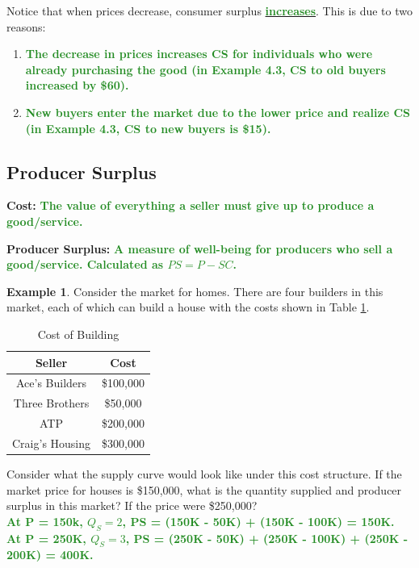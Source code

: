 \documentclass[11pt]{article}\usepackage[]{graphicx}\usepackage[]{color}
\theoremstyle{definition}
\newtheorem{exmp}{Example}[section]
\newcommand{\ddp}[1]{{\textbf{\textcolor{ForestGreen}{#1}}}}
\newcommand{\dd}[1]{{\underline{\textbf{\textcolor{ForestGreen}{#1}}}}}
\newcommand{\defn}[1]{\textbf{#1}}
\begin{document}
	Notice that when prices decrease, consumer surplus \dd{increases}. This is due to two reasons: 
	\begin{enumerate}
		\setlength{\itemsep}{15pt}
		\item \ddp{The decrease in prices increases CS for individuals who were already purchasing the good (in Example 4.3, CS to old buyers increased by \$60).}
		\item \ddp{New buyers enter the market due to the lower price and realize CS (in Example 4.3, CS to new buyers is \$15).}
	\end{enumerate}
	
	\subsection{Producer Surplus}
	
	\defn{Cost:} \ddp{The value of everything a seller must give up to produce a good/service.\\}

	
	\defn{Producer Surplus:} \ddp{A measure of well-being for producers who sell a good/service. Calculated as $PS = P - SC$.\\}

	
	\begin{exmp} 
		
		Consider the market for homes. There are four builders in this market, each of which can build a house with the costs shown in Table \ref{tab4}. 
	
	\begin{table}[ht]
		\caption{Cost of Building}
		\label{tab4}
		\centering
		\begin{tabular}{ c|c}        
			
			Seller   & Cost \\
			\hline
			Ace's Builders & \$100,000 \\
			Three Brothers & \$50,000 \\
			ATP & \$200,000 \\
			Craig's Housing & \$300,000 \\
		\end{tabular}
	\end{table} 
	\end{exmp}
	
	Consider what the supply curve would look like under this cost structure. If the market price for houses is \$150,000, what is the quantity supplied and producer surplus in this market? If the price were \$250,000?
		\ddp{\\ At P = 150k, $Q_S = 2$, PS = (150K - 50K) + (150K - 100K) = 150K. \\
			At P = 250K, $Q_S = 3$, PS = (250K - 50K) + (250K - 100K) + (250K - 200K) = 400K.}
		
\end{document}
